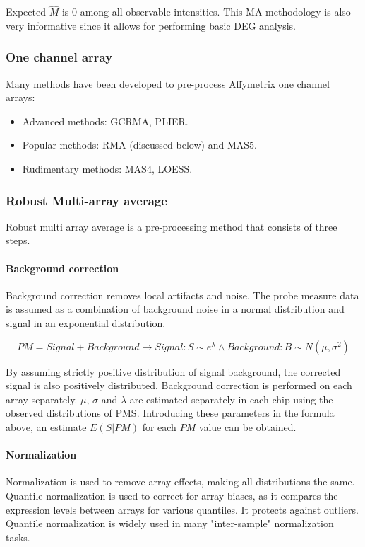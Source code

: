 			Expected $\hat{M}$ is $0$ among all observable intensities.
			This MA methodology is also very informative since it allows for performing basic DEG analysis.

		\subsubsection{One channel array}
		Many methods have been developed to pre-process Affymetrix one channel arrays:

		\begin{multicols}{3}
			\begin{itemize}
				\item Advanced methods: GCRMA, PLIER.
				\item Popular methods: RMA (discussed below) and MAS5.
				\item Rudimentary methods: MAS4, LOESS.
			\end{itemize}
		\end{multicols}

		\subsubsection{Robust Multi-array average}
		Robust multi array average is a pre-processing method that consists of three steps.

			\paragraph{Background correction}
			Background correction removes local artifacts and noise.
			The probe measure data is assumed as a combination of background noise in a normal distribution and signal in an exponential distribution.

			$$PM = Signal + Background \rightarrow Signal: S \sim e^\lambda \land Background : B\sim N(\mu, \sigma^2)$$


			By assuming strictly positive distribution of signal background, the corrected signal is also positively distributed.
			Background correction is performed on each array separately.
			$\mu$, $\sigma$ and $\lambda$ are estimated separately in each chip using the observed distributions of PMS.
			Introducing these parameters in the formula above, an estimate $E(S|PM)$ for each $PM$ value can be obtained.

			\paragraph{Normalization}
			Normalization is used to remove array effects, making all distributions the same.
			Quantile normalization is used to correct for array biases, as it compares the expression levels between arrays for various quantiles.
			It protects against outliers.
			Quantile normalization is widely used in many "inter-sample" normalization tasks.

